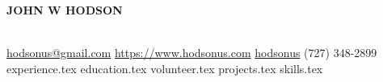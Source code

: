 \documentclass[11pt]{article} %
\newcommand*{\sectiondir}{sections/}
\begin{document}
	\noindent\centerline{ \huge\textbf{JOHN W HODSON}}\\

	\noindent
	\faEnvelopeSquare \space\href{mailto:hodsonus@gmail.com}{hodsonus@gmail.com} \hspace*{\fill}
	\faHome \space \href{https://www.hodsonus.com}{https://www.hodsonus.com} \hspace*{\fill}
	\faGithub \space \href{https://github.com/hodsonus}{hodsonus} \hspace*{\fill}
	\faMobilePhone \space (727) 348-2899\\

	{experience.tex}
	{education.tex}
	{volunteer.tex}
	{projects.tex}
	{skills.tex}
		
\end{document}
